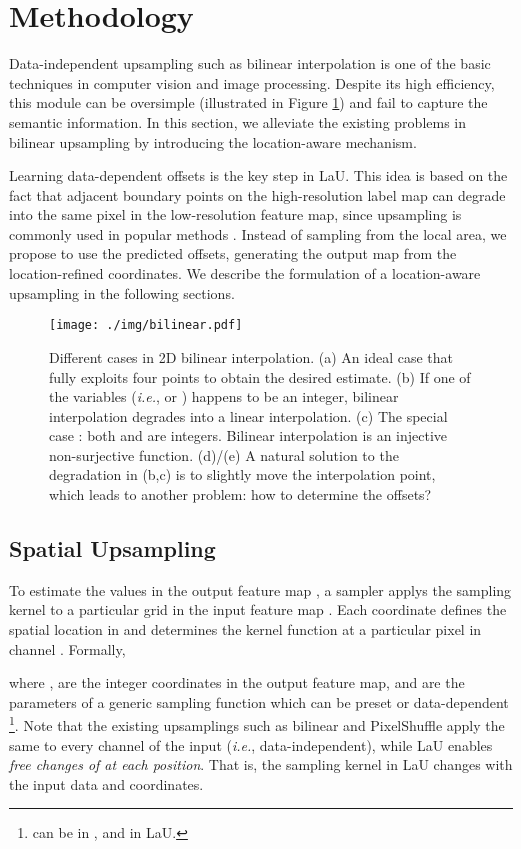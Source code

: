 \documentclass[10pt,twocolumn,letterpaper]{article}
\begin{document}
\section{Methodology}
Data-independent upsampling such as bilinear interpolation is one of the basic techniques in computer vision and image processing. Despite its high efficiency, this module can be oversimple (illustrated in Figure \ref{bilinear}) and fail to capture the semantic information. In this section, we alleviate the existing problems in bilinear upsampling by introducing the location-aware mechanism.

Learning data-dependent offsets is the key step in LaU. This idea is based on the fact that adjacent boundary points on the high-resolution label map can degrade into the same pixel in the low-resolution feature map, since  upsampling is commonly used in popular methods \cite{ASPP,PSPNet,EncNet}. Instead of sampling from the local area, we propose to use the predicted offsets, generating the output map from the location-refined coordinates. We describe the formulation of a location-aware upsampling in the following sections.

\begin{figure}
  \centering
  \texttt{[image: ./img/bilinear.pdf]} 
  \caption{Different cases in 2D bilinear interpolation. (a) An ideal case that fully exploits four points to obtain the desired estimate. (b) If one of the variables (\textit{i.e.},  or ) happens to be an integer, bilinear interpolation degrades into a linear interpolation.  (c) The special case :  both  and  are integers. Bilinear interpolation is an injective non-surjective function. (d)/(e) A natural solution to the degradation in (b,c) is to slightly move the interpolation point, which leads to another problem: how to determine the offsets? }  
\label{bilinear}
\end{figure}

\subsection{Spatial Upsampling}
To estimate the values in the output feature map , a sampler applys the sampling kernel to a particular grid  in the input feature map . Each coordinate  defines the spatial location in  and  determines the kernel function at a particular pixel  in channel .  Formally, 
 
where ,  are the integer coordinates in the output feature map,  and  are the parameters of a generic sampling function  which can be preset or data-dependent \footnote{ can be  in , and  in LaU.}. Note that the existing upsamplings such as bilinear and PixelShuffle apply the same  to every channel of the input (\textit{i.e.}, data-independent), while LaU enables \textit{free changes of  at each position}. That is, the sampling kernel in LaU changes with the input data and coordinates.
\end{document}
